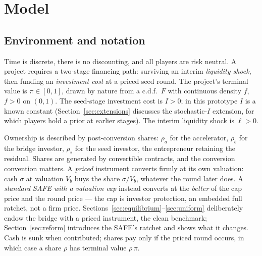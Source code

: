 \documentclass[11pt]{article}
\theoremstyle{definition}
\begin{document}
\section{Model}

\subsection{Environment and notation}

Time is discrete, there is no discounting, and all players are risk neutral. A project requires a two-stage financing path: surviving an interim \emph{liquidity shock}, then funding an \emph{investment cost} at a priced seed round. The project's terminal value is $\pi \in [0,1]$, drawn by nature from a c.d.f.\ $F$ with continuous density $f$, $f>0$ on $(0,1)$. The seed-stage investment cost is $I>0$; in this prototype $I$ is a known constant (Section~\ref{sec:extensions} discusses the stochastic-$I$ extension, for which players hold a prior at earlier stages). The interim liquidity shock is $\ell>0$.

Ownership is described by post-conversion shares: $\rho_a$ for the accelerator, $\rho_b$ for the bridge investor, $\rho_s$ for the seed investor, the entrepreneur retaining the residual. Shares are generated by convertible contracts, and the conversion convention matters. A \emph{priced} instrument converts firmly at its own valuation: cash $\sigma$ at valuation $V_b$ buys the share $\sigma/V_b$, whatever the round later does. A \emph{standard SAFE with a valuation cap} instead converts at the \emph{better} of the cap price and the round price --- the cap is investor protection, an embedded full ratchet, not a firm price. Sections~\ref{sec:equilibrium}--\ref{sec:uniform} deliberately endow the bridge with a priced instrument, the clean benchmark; Section~\ref{sec:reform} introduces the SAFE's ratchet and shows what it changes. Cash is sunk when contributed; shares pay only if the priced round occurs, in which case a share $\rho$ has terminal value $\rho\,\pi$.
\end{document}
